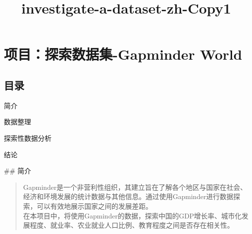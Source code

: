\documentclass[11pt]{article}
\title{investigate-a-dataset-zh-Copy1}
\begin{document}
    
    
    \maketitle
    
    

    
    \hypertarget{ux9879ux76eeux63a2ux7d22ux6570ux636eux96c6-gapminder-world}{%
\section{项目：探索数据集-Gapminder
World}\label{ux9879ux76eeux63a2ux7d22ux6570ux636eux96c6-gapminder-world}}

\hypertarget{ux76eeux5f55}{%
\subsection{目录}\label{ux76eeux5f55}}

简介

数据整理

探索性数据分析

结论

 \#\# 简介

\begin{quote}
Gapminder是一个非营利性组织，其建立旨在了解各个地区与国家在社会、经济和环境发展的统计数据与其他信息。通过使用Gapminder进行数据探索，可以有效地展示国家之间的发展差距。\\
在本项目中，将使用Gapminder的数据，探索中国的GDP增长率、城市化发展程度、就业率、农业就业人口比例、教育程度之间是否存在相关性。
\end{quote}
\end{document}
